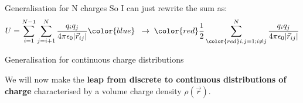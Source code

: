\begin{frame}{Generalisation for N charges}
\vspace{0.2cm}
So I can just rewrite the sum as:
     \begin{equation*}
        U = \sum_{i=1}^{N-1} \sum_{j=i+1}^{N} \frac{q_i q_j}{4\pi\epsilon_0|\vec{r}_{ij}|} {\color{blue} \;\; \rightarrow \;\;}
        {\color{red} \frac{1}{2}} \sum_{{\color{red}i,j=1;i{\ne}j}}^{N} \frac{q_i q_j} {4\pi\epsilon_0|\vec{r}_{ij}|}
     \end{equation*}

\end{frame}


%
%
%

\begin{frame}{Generalisation for continuous charge distributions}

We will now make the {\bf leap from discrete to continuous distributions of charge}
characterised by a volume charge density $\rho(\vec{r})$.


\end{frame}
